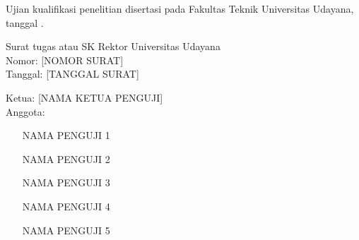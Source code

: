 \newpage
{}
\begin{center}
\begin{onehalfspace}
Ujian kualifikasi penelitian disertasi pada Fakultas Teknik Universitas Udayana, tanggal \tglujiandanpenilaian.
\end{onehalfspace}
\end{center}
\begin{center}
Surat tugas atau SK Rektor Universitas Udayana\\
Nomor: [NOMOR SURAT]\\
Tanggal: [TANGGAL SURAT]
\end{center}
\begin{onehalfspace}
\raggedright
Ketua: [NAMA KETUA PENGUJI]\\
Anggota:
\begin{enumerate}
\item [NAMA PENGUJI 1]
\item [NAMA PENGUJI 2]
\item [NAMA PENGUJI 3]
\item [NAMA PENGUJI 4]
\item [NAMA PENGUJI 5]
\end{enumerate}
\end{onehalfspace}
